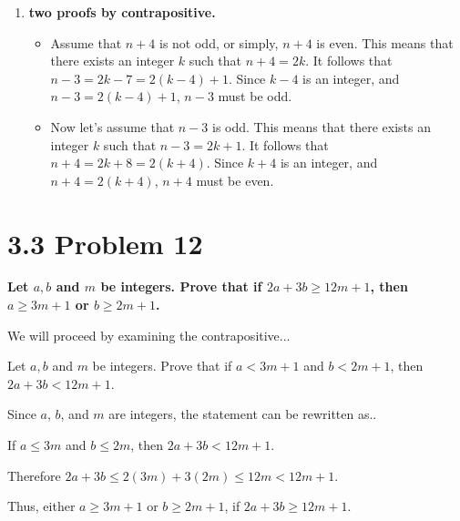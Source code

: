 \documentclass[10pt]{article}
\def \n {\par \vspace{\baselineskip}}
\begin{document}
\begin{enumerate}[label=(\alph*)]
    \item \textbf{two proofs by contrapositive.}

        \begin{itemize}
            \item Assume that $n + 4$ is not odd, or simply, $n + 4$ is even.  This means that there exists an integer $k$ 
                such that $n + 4 = 2k$.  It follows that $n - 3 = 2k - 7 = 2(k - 4) + 1$.  Since $k - 4$ is an integer, and 
                $n - 3 = 2(k - 4) + 1$, $n - 3$ must be odd.
        \end{itemize}

        \begin{itemize}
            \item Now let's assume that $n - 3$ is odd.  This means that there exists an integer $k$ such that $n - 3 = 2k + 1$.
                It follows that $n + 4 = 2k + 8 = 2(k + 4)$.  Since $k + 4$ is an integer, and $n + 4 = 2(k + 4)$, $n + 4$ must be even.
        \end{itemize}
    

\end{enumerate}





\section{3.3 Problem 12}
\textbf{Let $a,b$ and $m$ be integers.  Prove that if $2a + 3b \geq 12m +1$, then $a \geq 3m + 1$ or $b \geq 2m + 1$.}

We will proceed by examining the contrapositive...

Let $a,b$ and $m$ be integers.  Prove that if $a < 3m + 1$ and $b < 2m + 1$, then $2a + 3b < 12m + 1$.

\n
Since $a$, $b$, and $m$ are integers, the statement can be rewritten as..

If $a \leq 3m$ and $b \leq 2m$, then $2a + 3b < 12m + 1$.

\n
Therefore $2a + 3b \leq 2(3m) + 3(2m) \leq 12m < 12m + 1$.

\n
Thus, either $a \geq 3m + 1$ or $b \geq 2m + 1$, if $2a + 3b \geq 12m + 1$.
\end{document}

